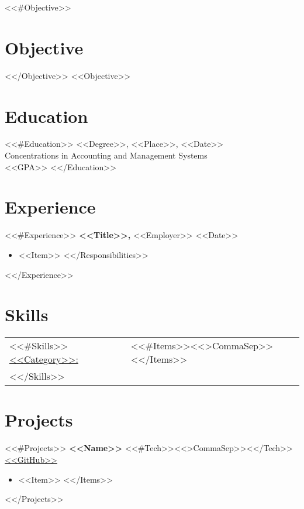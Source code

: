 \documentclass[margin]{res}
\begin{document}
 
 
 
\address{{\bf Present Address} \\ 204 Pawling Avenue \\ Troy, NY 12180  \\
        (518) 273-4617 }
\address{\url{<<Email>>} \\ \url{<<LinkedIn>>} \\ \url{<<Website>>}}

\begin{resume} 
 
<<#Objective>>\section{Objective}<</Objective>>
<<Objective>>

\section{Education}
<<#Education>>
<<Degree>>, <<Place>>, <<Date>> \\
Concentrations in Accounting and Management Systems \\
<<GPA>>
<</Education>>

\section{Experience}
<<#Experience>>
 {\bf <<Title>>,} <<Employer>> \hfill <<Date>>
 \begin{itemize} \itemsep -2pt  %
 <<#Responsibilities>>
 \item <<Item>>
 <</Responsibilities>>
 \end{itemize}
<</Experience>>

\section{Skills}
  \begin{tabular}{l p{4in}}
    <<#Skills>>
    \underline{<<Category>>:} & <<#Items>><<>CommaSep>><</Items>> \\
    <</Skills>>
  \end{tabular}

\section{Projects}
<<#Projects>>
 {\bf <<Name>>} \hfill <<#Tech>><<>CommaSep>><</Tech>>
 \url{<<GitHub>>}
 \begin{itemize}
 <<#Items>>
 \item <<Item>>
 <</Items>>
 \end{itemize}
<</Projects>>

\end{resume} 
\end{document}
